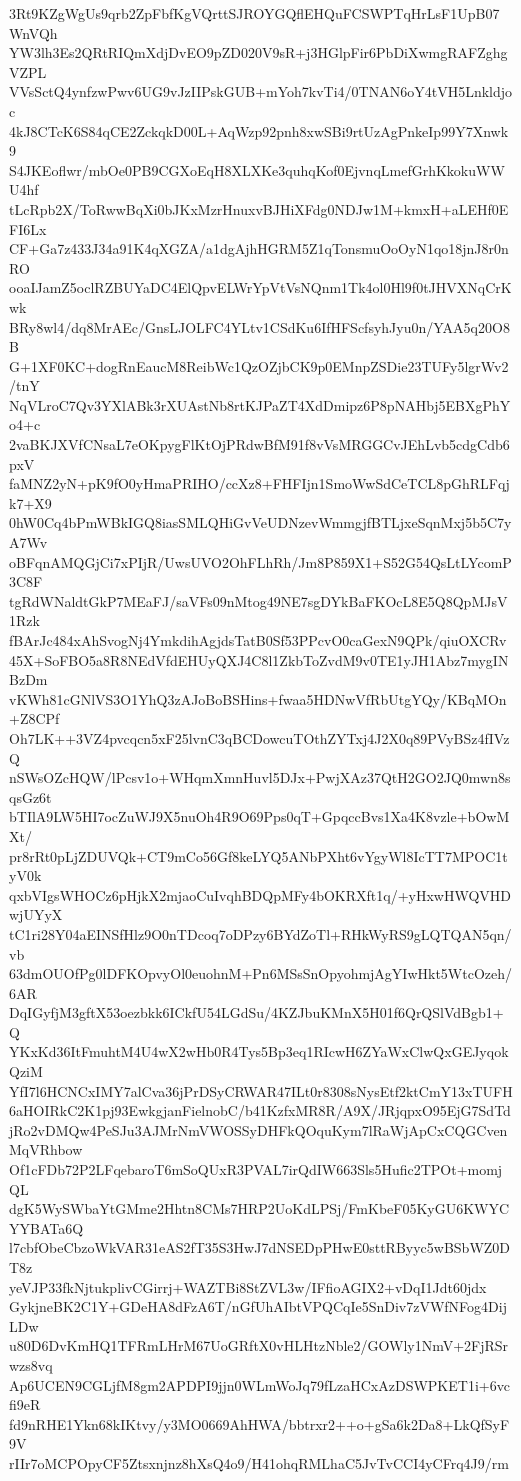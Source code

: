 3Rt9KZgWgUs9qrb2ZpFbfKgVQrttSJROYGQflEHQuFCSWPTqHrLsF1UpB07WnVQh
YW3lh3Es2QRtRIQmXdjDvEO9pZD020V9sR+j3HGlpFir6PbDiXwmgRAFZghgVZPL
VVsSctQ4ynfzwPwv6UG9vJzIIPskGUB+mYoh7kvTi4/0TNAN6oY4tVH5Lnkldjoc
4kJ8CTcK6S84qCE2ZckqkD00L+AqWzp92pnh8xwSBi9rtUzAgPnkeIp99Y7Xnwk9
S4JKEoflwr/mbOe0PB9CGXoEqH8XLXKe3quhqKof0EjvnqLmefGrhKkokuWWU4hf
tLcRpb2X/ToRwwBqXi0bJKxMzrHnuxvBJHiXFdg0NDJw1M+kmxH+aLEHf0EFI6Lx
CF+Ga7z433J34a91K4qXGZA/a1dgAjhHGRM5Z1qTonsmuOoOyN1qo18jnJ8r0nRO
ooaIJamZ5oclRZBUYaDC4ElQpvELWrYpVtVsNQnm1Tk4ol0Hl9f0tJHVXNqCrKwk
BRy8wl4/dq8MrAEc/GnsLJOLFC4YLtv1CSdKu6IfHFScfsyhJyu0n/YAA5q20O8B
G+1XF0KC+dogRnEaucM8ReibWc1QzOZjbCK9p0EMnpZSDie23TUFy5lgrWv2/tnY
NqVLroC7Qv3YXlABk3rXUAstNb8rtKJPaZT4XdDmipz6P8pNAHbj5EBXgPhYo4+c
2vaBKJXVfCNsaL7eOKpygFlKtOjPRdwBfM91f8vVsMRGGCvJEhLvb5cdgCdb6pxV
faMNZ2yN+pK9fO0yHmaPRIHO/ccXz8+FHFIjn1SmoWwSdCeTCL8pGhRLFqjk7+X9
0hW0Cq4bPmWBkIGQ8iasSMLQHiGvVeUDNzevWmmgjfBTLjxeSqnMxj5b5C7yA7Wv
oBFqnAMQGjCi7xPIjR/UwsUVO2OhFLhRh/Jm8P859X1+S52G54QsLtLYcomP3C8F
tgRdWNaldtGkP7MEaFJ/saVFs09nMtog49NE7sgDYkBaFKOcL8E5Q8QpMJsV1Rzk
fBArJc484xAhSvogNj4YmkdihAgjdsTatB0Sf53PPcvO0caGexN9QPk/qiuOXCRv
45X+SoFBO5a8R8NEdVfdEHUyQXJ4C8l1ZkbToZvdM9v0TE1yJH1Abz7mygINBzDm
vKWh81cGNlVS3O1YhQ3zAJoBoBSHins+fwaa5HDNwVfRbUtgYQy/KBqMOn+Z8CPf
Oh7LK++3VZ4pvcqcn5xF25lvnC3qBCDowcuTOthZYTxj4J2X0q89PVyBSz4fIVzQ
nSWsOZcHQW/lPcsv1o+WHqmXmnHuvl5DJx+PwjXAz37QtH2GO2JQ0mwn8sqsGz6t
bTIlA9LW5HI7ocZuWJ9X5nuOh4R9O69Pps0qT+GpqccBvs1Xa4K8vzle+bOwMXt/
pr8rRt0pLjZDUVQk+CT9mCo56Gf8keLYQ5ANbPXht6vYgyWl8IcTT7MPOC1tyV0k
qxbVIgsWHOCz6pHjkX2mjaoCuIvqhBDQpMFy4bOKRXft1q/+yHxwHWQVHDwjUYyX
tC1ri28Y04aEINSfHlz9O0nTDcoq7oDPzy6BYdZoTl+RHkWyRS9gLQTQAN5qn/vb
63dmOUOfPg0lDFKOpvyOl0euohnM+Pn6MSsSnOpyohmjAgYIwHkt5WtcOzeh/6AR
DqIGyfjM3gftX53oezbkk6ICkfU54LGdSu/4KZJbuKMnX5H01f6QrQSlVdBgb1+Q
YKxKd36ItFmuhtM4U4wX2wHb0R4Tys5Bp3eq1RIcwH6ZYaWxClwQxGEJyqokQziM
YfI7l6HCNCxIMY7alCva36jPrDSyCRWAR47ILt0r8308sNysEtf2ktCmY13xTUFH
6aHOIRkC2K1pj93EwkgjanFielnobC/b41KzfxMR8R/A9X/JRjqpxO95EjG7SdTd
jRo2vDMQw4PeSJu3AJMrNmVWOSSyDHFkQOquKym7lRaWjApCxCQGCvenMqVRhbow
Of1cFDb72P2LFqebaroT6mSoQUxR3PVAL7irQdIW663Sls5Hufic2TPOt+momjQL
dgK5WySWbaYtGMme2Hhtn8CMs7HRP2UoKdLPSj/FmKbeF05KyGU6KWYCYYBATa6Q
l7cbfObeCbzoWkVAR31eAS2fT35S3HwJ7dNSEDpPHwE0sttRByyc5wBSbWZ0DT8z
yeVJP33fkNjtukplivCGirrj+WAZTBi8StZVL3w/IFfioAGIX2+vDqI1Jdt60jdx
GykjneBK2C1Y+GDeHA8dFzA6T/nGfUhAIbtVPQCqIe5SnDiv7zVWfNFog4DijLDw
u80D6DvKmHQ1TFRmLHrM67UoGRftX0vHLHtzNble2/GOWly1NmV+2FjRSrwzs8vq
Ap6UCEN9CGLjfM8gm2APDPI9jjn0WLmWoJq79fLzaHCxAzDSWPKET1i+6vcfi9eR
fd9nRHE1Ykn68kIKtvy/y3MO0669AhHWA/bbtrxr2++o+gSa6k2Da8+LkQfSyF9V
rIIr7oMCPOpyCF5Ztsxnjnz8hXsQ4o9/H41ohqRMLhaC5JvTvCCI4yCFrq4J9/rm
